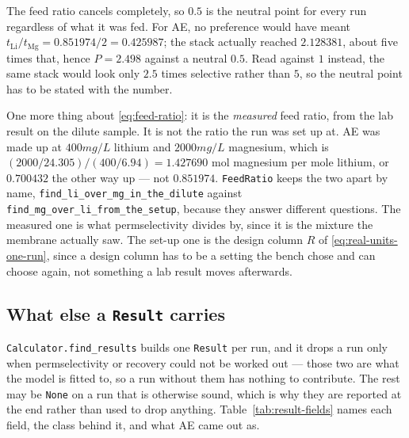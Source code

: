 The feed ratio cancels completely, so $0.5$ is the neutral point for every run regardless of
what it was fed. For AE, no preference would have meant
$t_{\mathrm{Li}} / t_{\mathrm{Mg}} = 0.851974 / 2 = 0.425987$; the stack actually reached
$2.128381$, about five times that, hence $P = 2.498$ against a neutral $0.5$. Read against $1$
instead, the same stack would look only $2.5$ times selective rather than $5$, so the neutral
point has to be stated with the number.

One more thing about \eqref{eq:feed-ratio}: it is the \emph{measured} feed ratio, from the lab
result on the dilute sample. It is not the ratio the run was set up at. AE was made up at
$400\unit{mg/L}$ lithium and $2000\unit{mg/L}$ magnesium, which is
$(2000/24.305) / (400/6.94) = 1.427690$ mol magnesium per mole lithium, or $0.700432$ the
other way up --- not $0.851974$. \texttt{FeedRatio} keeps the two apart by name,
\texttt{find\_li\_over\_mg\_in\_the\_dilute} against
\texttt{find\_mg\_over\_li\_from\_the\_setup}, because they answer different questions. The
measured one is what permselectivity divides by, since it is the mixture the membrane actually
saw. The set-up one is the design column $R$ of \eqref{eq:real-units-one-run}, since a design
column has to be a setting the bench chose and can choose again, not something a lab result
moves afterwards.

\subsection{What else a \texttt{Result} carries}

\texttt{Calculator.find\_results} builds one \texttt{Result} per run, and it drops a run only
when permselectivity or recovery could not be worked out --- those two are what the model is
fitted to, so a run without them has nothing to contribute. The rest may be \texttt{None} on a
run that is otherwise sound, which is why they are reported at the end rather than used to
drop anything. Table~\ref{tab:result-fields} names each field, the class behind it, and what
AE came out as.

